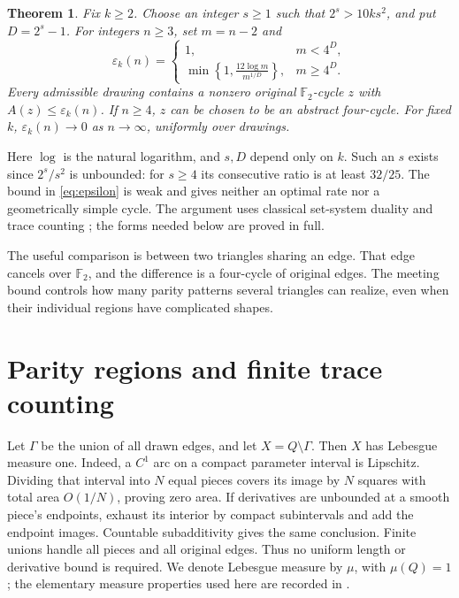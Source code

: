 \documentclass[11pt]{article}
\newtheorem{theorem}{Theorem}
\newcommand{\F}{\mathbb F_2}
\begin{document}
\begin{theorem}\label{thm:main}
Fix $k\ge2$. Choose an integer $s\ge1$ such that $2^s>10ks^2$, and put $D=2^s-1$. For integers $n\ge3$, set $m=n-2$ and
\begin{equation}\label{eq:epsilon}
\varepsilon_k(n)=
\begin{cases}
1,&m<4^D,\\[2pt]
\displaystyle\min\left\{1,\frac{12\log m}{m^{1/D}}\right\},&m\ge4^D.
\end{cases}
\end{equation}
Every admissible drawing contains a nonzero original $\F$-cycle $z$ with $A(z)\le\varepsilon_k(n)$. If $n\ge4$, $z$ can be chosen to be an abstract four-cycle. For fixed $k$, $\varepsilon_k(n)\to0$ as $n\to\infty$, uniformly over drawings.
\end{theorem}

Here $\log$ is the natural logarithm, and $s,D$ depend only on $k$. Such an $s$ exists since $2^s/s^2$ is unbounded: for $s\ge4$ its consecutive ratio is at least $32/25$. The bound in \eqref{eq:epsilon} is weak and gives neither an optimal rate nor a geometrically simple cycle. The argument uses classical set-system duality and trace counting \cite[Lemma~1.8 and Proposition~2.12]{Assouad}; the forms needed below are proved in full.

The useful comparison is between two triangles sharing an edge. That edge cancels over $\F$, and the difference is a four-cycle of original edges. The meeting bound controls how many parity patterns several triangles can realize, even when their individual regions have complicated shapes.

\section{Parity regions and finite trace counting}

Let $\Gamma$ be the union of all drawn edges, and let $X=Q\setminus\Gamma$. Then $X$ has Lebesgue measure one. Indeed, a $C^1$ arc on a compact parameter interval is Lipschitz. Dividing that interval into $N$ equal pieces covers its image by $N$ squares with total area $O(1/N)$, proving zero area. If derivatives are unbounded at a smooth piece's endpoints, exhaust its interior by compact subintervals and add the endpoint images. Countable subadditivity gives the same conclusion. Finite unions handle all pieces and all original edges. Thus no uniform length or derivative bound is required. We denote Lebesgue measure by $\mu$, with $\mu(Q)=1$; the elementary measure properties used here are recorded in \cite[Section~1.2]{Tao}.
\end{document}
